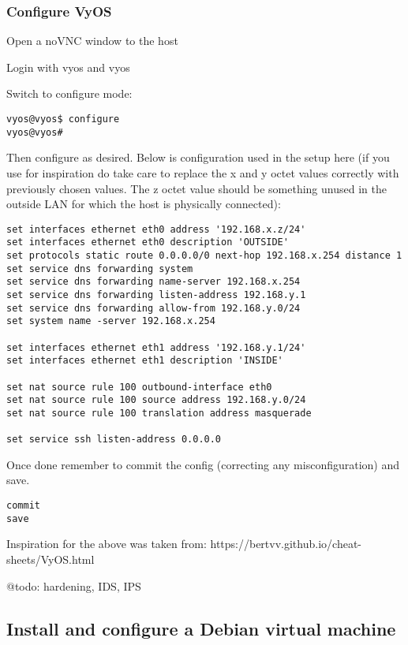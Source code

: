 \hypertarget{configure-vyos}{%
\subsubsection{Configure VyOS}\label{configure-vyos}}

Open a noVNC window to the host

Login with vyos and vyos

Switch to configure mode:

\begin{verbatim}
vyos@vyos$ configure
vyos@vyos#
\end{verbatim}

Then configure as desired. Below is configuration used in the setup here
(if you use for inspiration do take care to replace the x and y octet
values correctly with previously chosen values. The z octet value should
be something unused in the outside LAN for which the host is physically
connected):

\begin{verbatim}
set interfaces ethernet eth0 address '192.168.x.z/24'
set interfaces ethernet eth0 description 'OUTSIDE'
set protocols static route 0.0.0.0/0 next-hop 192.168.x.254 distance 1
set service dns forwarding system
set service dns forwarding name-server 192.168.x.254
set service dns forwarding listen-address 192.168.y.1
set service dns forwarding allow-from 192.168.y.0/24
set system name -server 192.168.x.254

set interfaces ethernet eth1 address '192.168.y.1/24'
set interfaces ethernet eth1 description 'INSIDE'

set nat source rule 100 outbound-interface eth0
set nat source rule 100 source address 192.168.y.0/24
set nat source rule 100 translation address masquerade

set service ssh listen-address 0.0.0.0
\end{verbatim}

Once done remember to commit the config (correcting any
misconfiguration) and save.

\begin{verbatim}
commit
save
\end{verbatim}

Inspiration for the above was taken from:
https://bertvv.github.io/cheat-sheets/VyOS.html

@todo: hardening, IDS, IPS

\hypertarget{install-and-configure-a-debian-virtual-machine}{%
\subsection{Install and configure a Debian virtual
machine}\label{install-and-configure-a-debian-virtual-machine}}

